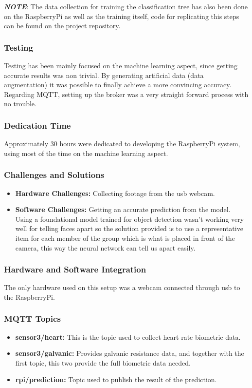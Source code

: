 \textbf{\textit{NOTE}}: The data collection for training the classification tree has also been done on the RaspberryPi as well as the training itself, code for replicating this steps can be found on the project repository.

\subsubsection{Testing}
Testing has been mainly focused on the machine learning aspect, since getting accurate results was non trivial. By generating artificial data (data augmentation) it was possible to finally achieve a more convincing accuracy. Regarding MQTT, setting up the broker was a very straight forward process with no trouble.

\subsubsection{Dedication Time}
Approximately 30 hours were dedicated to developing the RaspberryPi system, using most of the time on the machine learning aspect.

\subsubsection{Challenges and Solutions}
\begin{itemize}
    \item \textbf{Hardware Challenges:} Collecting footage from the usb webcam.
    \item \textbf{Software Challenges:} Getting an accurate prediction from the model. Using a foundational model trained for object detection wasn't working very well for telling faces apart so the solution provided is to use a representative item for each member of the group which is what is placed in front of the camera, this way the neural network can tell us apart easily.
\end{itemize}

\subsubsection{Hardware and Software Integration}
The only hardware used on this setup was a webcam connected through usb to the RaspberryPi.

\subsubsection{MQTT Topics}
\begin{itemize}
    \item \textbf{sensor3/heart:} This is the topic used to collect heart rate biometric data.
    \item \textbf{sensor3/galvanic:} Provides galvanic resistance data, and together with the first topic, this two provide the full biometric data needed.
    \item \textbf{rpi/prediction:} Topic used to publish the result of the prediction.
\end{itemize}

